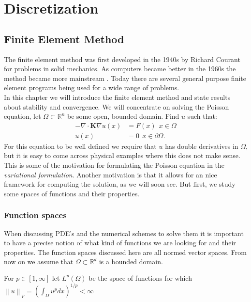 \documentclass[../Main/main.tex]{subfiles}
\begin{document}
	\graphicspath{{../Discretization/figs/}}
	\chapter{Discretization}
	\section*{Finite Element Method}
	The finite element method was first developed in the 1940s by Richard Courant for problems in solid mechanics. As computers became better in the 1960s the method became  more mainstream \cite{Stein2014}. Today there are several general purpose finite element programs being used for a wide range of problems.\\
	In this chapter we will introduce the finite element method and state results about stability and convergence.
	We will concentrate on solving the Poisson equation, let $\Omega \subset \mathbb{R}^n$ be some open, bounded domain. Find $u$ such that:
	\begin{equation} \label{eq:poisson}
		\begin{split}
			-\nabla \cdot \bm{K} \nabla u(x) &= F(x) \ \  x\in \Omega \\ 
			u(x) &= 0 \ \ x\in \partial \Omega.
		\end{split}
	\end{equation}
	For this equation to be well defined we require that $u$ has double derivatives in $\Omega$, but it is easy to come across physical examples where this does not make sense.
	This is some of the motivation for formulating the Poisson equation in the \emph{variational formulation}. Another motivation is that it allows for an nice framework for computing the solution, as we will soon see. But first, we study some spaces of functions and their properties.
	
	
	\subsection*{Function spaces}
	When discussing PDE's and the numerical schemes to solve them it is important to have a precise notion of what kind of functions we are looking for and their properties. The function spaces discussed here are all normed vector spaces. From now on we assume that $\Omega \subset \mathbb{R}^d$ is a bounded domain.
	\begin{definition}
		For $p\in [1,\infty]$ let $L^p(\Omega)$ be the space of functions for which  $\left \| u \right \|_p = (\int_{\Omega} u^pdx)^{1/p} <\infty$
	\end{definition}
\end{document}
